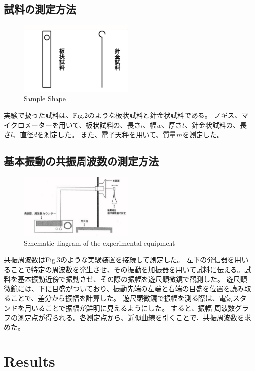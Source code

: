 \documentclass[a4paper,11pt]{jsarticle}
\begin{document}
\subsection{試料の測定方法}
\begin{figure}[H]
  \centering
  \includegraphics[width=0.5\textwidth]{figs/shape_sample.pdf}
  \caption{Sample Shape}
\end{figure}
実験で扱った試料は、Fig.2のような板状試料と針金状試料である。
ノギス、マイクロメーターを用いて、板状試料の、長さ$l$、幅$w$、厚さ$t$、針金状試料の、長さ$l$、直径$d$を測定した。
また、電子天秤を用いて、質量$m$を測定した。
\subsection{基本振動の共振周波数の測定方法}
\begin{figure}[H]
  \centering
  \includegraphics[width=0.5\textwidth]{figs/device_sample.pdf}
  \caption{Schematic diagram of the experimental equipment}
\end{figure}
共振周波数はFig.3のような実験装置を接続して測定した。
左下の発信器を用いることで特定の周波数を発生させ、その振動を加振器を用いて試料に伝える。試料を基本振動近傍で振動させ、その際の振幅を遊尺顕微鏡で観測した。
遊尺顕微鏡には、下に目盛がついており、振動先端の左端と右端の目盛を位置を読み取ることで、差分から振幅を計算した。
遊尺顕微鏡で振幅を測る際は、電気スタンドを用いることで振幅が鮮明に見えるようにした。
すると、振幅-周波数グラフの測定点が得られる。各測定点から、近似曲線を引くことで、共振周波数を求めた。
\clearpage
\section{Results}
\end{document}

